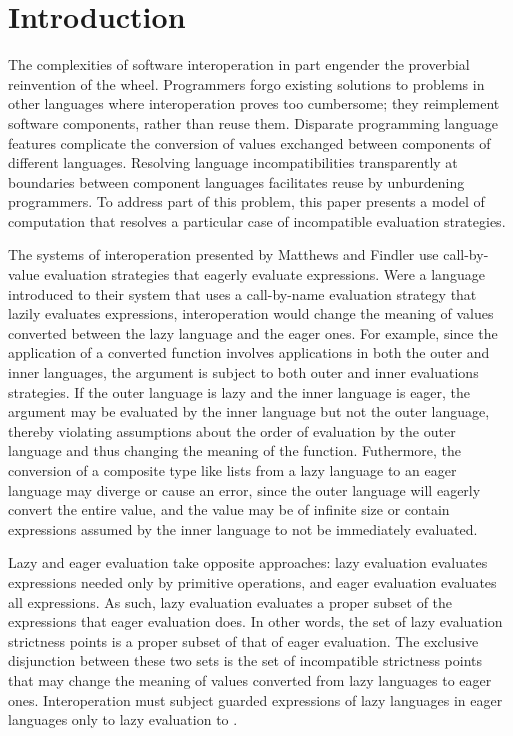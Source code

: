 \section{Introduction}

The complexities of software interoperation in part engender the proverbial reinvention of the wheel. Programmers forgo existing solutions to problems in other languages where interoperation proves too cumbersome; they reimplement software components, rather than reuse them. Disparate programming language features complicate the conversion of values exchanged between components of different languages. Resolving language incompatibilities transparently at boundaries between component languages facilitates reuse by unburdening programmers. To address part of this problem, this paper presents a model of computation that resolves a particular case of incompatible evaluation strategies.

The systems of interoperation presented by Matthews and Findler \cite{matthews07} use call-by-value evaluation strategies that eagerly evaluate expressions. Were a language introduced to their system that uses a call-by-name evaluation strategy that lazily evaluates expressions, interoperation would change the meaning of values converted between the lazy language and the eager ones. For example, since the application of a converted function involves applications in both the outer and inner languages, the argument is subject to both outer and inner evaluations strategies. If the outer language is lazy and the inner language is eager, the argument may be evaluated by the inner language but not the outer language, thereby violating assumptions about the order of evaluation by the outer language and thus changing the meaning of the function. Futhermore, the conversion of a composite type like lists from a lazy language to an eager language may diverge or cause an error, since the outer language will eagerly convert the entire value, and the value may be of infinite size or contain expressions assumed by the inner language to not be immediately evaluated.

Lazy and eager evaluation take opposite approaches: lazy evaluation evaluates expressions needed only by primitive operations, and eager evaluation evaluates all expressions. As such, lazy evaluation evaluates a proper subset of the expressions that eager evaluation does. In other words, the set of lazy evaluation strictness points is a proper subset of that of eager evaluation. The exclusive disjunction between these two sets is the set of incompatible strictness points that may change the meaning of values converted from lazy languages to eager ones. Interoperation must subject guarded expressions of lazy languages in eager languages only to lazy evaluation to .

